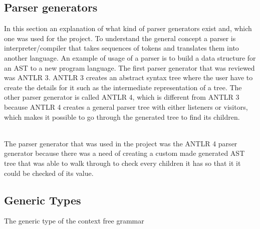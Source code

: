 \subsection{Parser generators}
In this section an explanation of what kind of parser generators exist and, which one was used for the project. To understand the general concept a parser is interpreter/compiler that takes sequences of tokens and translates them into another language. An example of usage of a parser is to build a data structure for an AST to a new program language.  %
The first parser generator that was reviewed was  ANTLR 3. ANTLR 3 creates an abstract syntax tree where the user have to create the details for it such as the  intermediate representation of a tree. The other parser generator is called ANTLR 4, which is different from ANTLR 3 because ANTLR 4 creates a general parser tree with either listeners or visitors, which makes it possible to go through the generated tree to find its children. %

\\
The parser generator that was used in the project was the ANTLR 4 parser generator because there was a need of creating a custom made  generated AST tree that was able to walk through to check every children it has so that it it could be checked of its value.   

\subsection{Generic Types}
The generic type of the context free grammar 